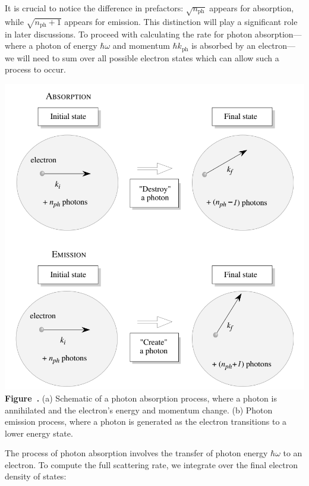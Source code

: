 It is crucial to notice the difference in prefactors: \( \sqrt{n_{\text{ph}}} \) appears for absorption, while \( \sqrt{n_{\text{ph}} + 1} \) appears for emission. This distinction will play a significant role in later discussions.
To proceed with calculating the rate for photon absorption—where a photon of energy \(\hbar \omega\) and momentum \(\hbar k_{\text{ph}}\) is absorbed by an electron—we will need to sum over all possible electron states which can allow such a process to occur.\\
\begin{center}
	\begin{minipage}{0.5\textwidth}
		\centering
		\includegraphics[width=\textwidth]{img/Abs&emiss.png}
		\\[0.5em]
		\textbf{Figure~\thefigure.} (a) Schematic of a photon absorption process, where a photon is annihilated and the electron’s energy and momentum change.  
(b) Photon emission process, where a photon is generated as the electron transitions to a lower energy state. 
		\label{fig:Abs&emiss}
	\end{minipage}
\end{center}
The process of photon absorption involves the transfer of photon energy \(\hbar \omega\) to an electron. To compute the full scattering rate, we integrate over the final electron density of states:
